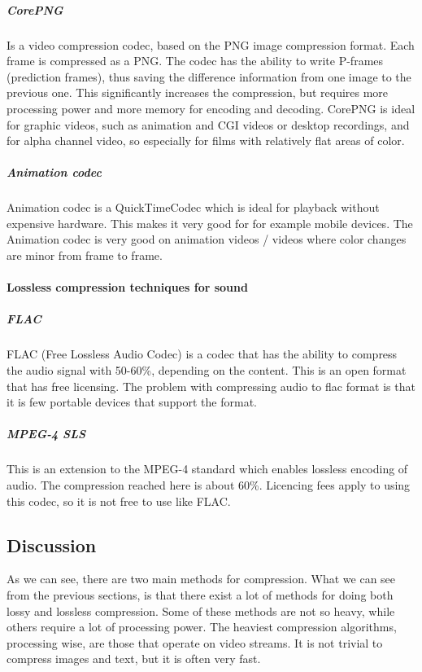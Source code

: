 \subparagraph{CorePNG} \hfill
\newline
Is a video compression codec, based on the PNG image compression format. Each frame is compressed as a PNG. The codec has the ability to write P-frames (prediction frames), thus saving the difference information from one image to the previous one. This significantly increases the compression, but requires more processing power and more memory for encoding and decoding. CorePNG is ideal for graphic videos, such as animation and CGI videos or desktop recordings, and for alpha channel video, so especially for films with relatively flat areas of color. \cite{bib:corePNG}

\subparagraph{Animation codec} \hfill
\newline
Animation codec is a QuickTimeCodec which is ideal for playback without expensive hardware.  This makes it very good for for example mobile devices. The Animation codec is very good on animation videos / videos where color changes are minor from frame to frame.
 \cite{bib:animationCodec}

\paragraph{Lossless compression techniques for sound}

\subparagraph{FLAC}\hfill
\newline
FLAC (Free Lossless Audio Codec) is a codec that has the ability to compress the audio signal with 50-60\%, depending on the content. This is an open format that has free licensing. The problem with compressing audio to flac format is that it is few portable devices that support the format. \cite{bib:FLAC}

\subparagraph{MPEG-4 SLS}\hfill
\newline
This is an extension to the MPEG-4 standard which enables lossless encoding of audio. The compression reached here is about 60\%. Licencing fees apply to using this codec, so it is not free to use like FLAC. \cite{bib:MPEGSLS}

\subsection{Discussion}
As we can see, there are two main methods for compression. What we can see from the previous sections, is that there exist a lot of methods for doing both lossy and lossless compression. Some of these methods are not so heavy, while others require a lot of processing power. The heaviest compression algorithms, processing wise, are those that operate on video streams. It is not trivial to compress images and text, but it is often very fast.

